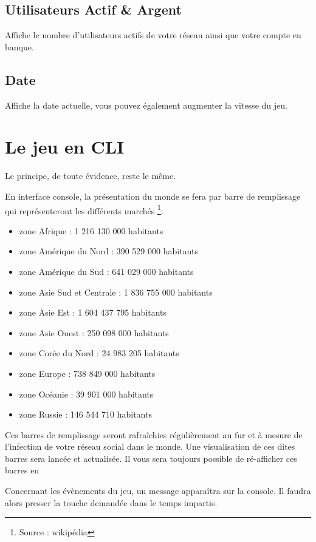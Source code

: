 \subsection{Utilisateurs Actif \& Argent}
Affiche le nombre d'utilisateurs actifs de votre réseau ainsi que votre compte en banque.
\subsection{Date}
Affiche la date actuelle, vous pouvez également augmenter la vitesse du jeu.

\section{Le jeu en CLI}
Le principe, de toute évidence, reste le même.

En interface console, la présentation du monde se fera par barre de remplissage qui représenteront les différents marchés \footnote{Source : wikipédia}: 
    \begin{itemize}
                \item zone Afrique : 1 216 130 000 habitants
                \item zone Amérique du Nord : 390 529 000 habitants
                \item zone Amérique du Sud : 641 029 000 habitants
                \item zone Asie Sud et Centrale : 1 836 755 000 habitants
                \item zone Asie Est : 1 604 437 795 habitants
                \item zone Asie Ouest : 250 098 000 habitants
                \item zone Corée du Nord : 24 983 205 habitants
                \item zone Europe : 738 849 000 habitants
                \item zone Océanie : 39 901 000 habitants
                \item zone Russie : 146 544  710 habitants
    \end{itemize}

Ces barres de remplissage seront rafraîchies régulièrement au fur et à mesure de l'infection de votre réseau social dans le monde. Une visualisation de ces dites barres sera lancée et actualisée. Il vous sera toujours possible de ré-afficher ces barres en 

Concernant les évènements du jeu, un message apparaîtra sur la console. Il faudra alors presser la touche demandée dans le temps impartis.

